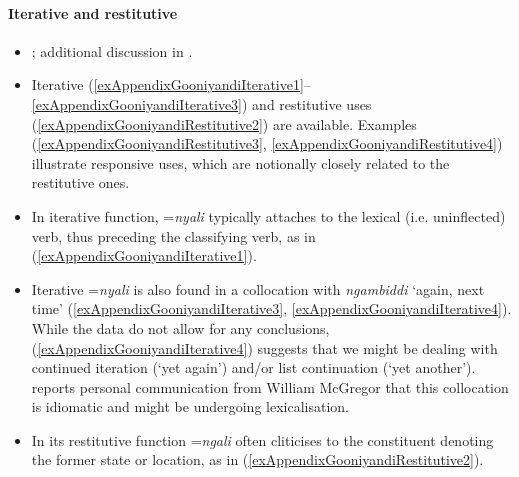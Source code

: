 \paragraph{Iterative and restitutive}
\label{appendixGooniyandiIterative}
\begin{itemize}
	\sloppy
	\item \textcite[460–462]{McGregor1990}; additional discussion in \textcite{SchultzeBerndt2002}.
	\item Iterative (\ref{exAppendixGooniyandiIterative1}–\ref{exAppendixGooniyandiIterative3}) and restitutive uses (\ref{exAppendixGooniyandiRestitutive2}) are available. Examples (\ref{exAppendixGooniyandiRestitutive3}, \ref{exAppendixGooniyandiRestitutive4}) illustrate responsive uses, which are notionally closely related to the restitutive ones.
	\item In iterative function, \mbox{=\textit{nyali}} typically attaches to the lexical (i.e. uninflected) verb, thus preceding the classifying verb, as in (\ref{exAppendixGooniyandiIterative1}).
	\item Iterative \mbox{=\textit{nyali}} is also found in a collocation with \textit{ngambiddi} \lq again, next time' (\ref{exAppendixGooniyandiIterative3}, \ref{exAppendixGooniyandiIterative4}). While the data do not allow for any conclusions, (\ref{exAppendixGooniyandiIterative4}) suggests that we might be dealing with continued iteration (\lq yet again') and/or list continuation (\lq yet another'). \textcite[244]{SchultzeBerndt2002} reports personal communication from William McGregor that this collocation is idiomatic and might be undergoing lexicalisation.
	\item In its restitutive function \mbox{=\textit{ngali}} often cliticises to the constituent denoting the former state or location, as in (\ref{exAppendixGooniyandiRestitutive2}).

\end{itemize}
